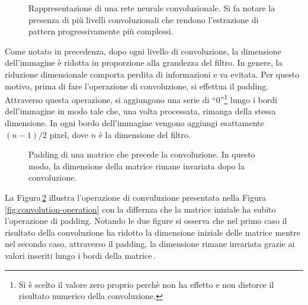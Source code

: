 % 
\begin{figure}[!t]
    \centering
    
    \caption[Rappresentazione di una rete neurale convoluzionale.]{Rappresentazione di una rete neurale convoluzionale. Si fa notare la presenza di più livelli convoluzionali che rendono l'estrazione di pattern progressivamente più complessi.}\label{fig:convolutional-neural-network}
\end{figure}

Come notato in precedenza, dopo ogni livello di convoluzione, la dimensione dell'immagine è ridotta in proporzione alla grandezza del filtro. In genere, la riduzione dimensionale comporta perdita di informazioni e va evitata. Per questo motivo, prima di fare l'operazione di convoluzione, si effettua il padding. Attraverso questa operazione, si aggiungono una serie di ``0''\footnote{Si è scelto il valore zero proprio perchè non ha effetto e non distorce il risultato numerico della convoluzione.} lungo i bordi dell'immagine in modo tale che, una volta processata, rimanga della stessa dimensione. In ogni bordo dell'immagine vengono aggiungi esattamente $(n - 1) / 2$ pixel, dove $n$ è la dimensione del filtro. 
% 
\begin{figure}[!t]
    \centering
    
    \caption[Padding di una matrice che precede la convoluzione.]{Padding di una matrice che precede la convoluzione. In questo modo, la dimensione della matrice rimane invariata dopo la convoluzione.}\label{fig:padding}
\end{figure}
% 
La Figura\,\ref{fig:padding} illustra l'operazione di convuluzione presentata nella Figura\,\ref{fig:convolution-operation} con la differnza che la matrice iniziale ha subito l'operazione di padding. Notando le due figure si osserva che nel primo caso il risultato della convoluzione ha ridotto la dimensione iniziale delle matrice mentre nel secondo caso, attraverso il padding, la dimensione rimane invariata grazie ai valori inseriti lungo i bordi della matrice\,\cite{aggarwal2018neural}.

